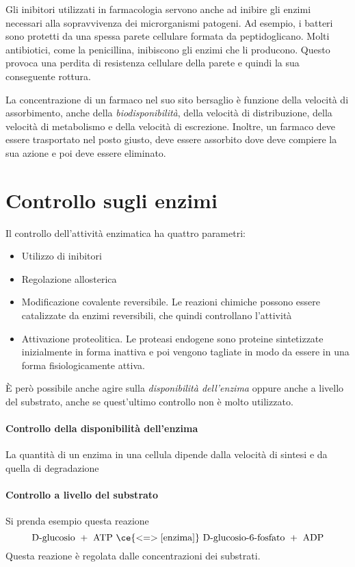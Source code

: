 Gli inibitori utilizzati in farmacologia servono anche ad inibire gli enzimi necessari alla sopravvivenza dei microrganismi patogeni. Ad esempio, i batteri sono protetti da una spessa parete cellulare formata da peptidoglicano. Molti antibiotici, come la penicillina, inibiscono gli enzimi che li producono. Questo provoca una perdita di resistenza cellulare della parete e quindi la sua conseguente rottura.

La concentrazione di un farmaco nel suo sito bersaglio è funzione della velocità di assorbimento, anche della \emph{biodisponibilità}, della velocità di distribuzione, della velocità di metabolismo e della velocità di escrezione. Inoltre, un farmaco deve essere trasportato nel posto giusto, deve essere assorbito dove deve compiere la sua azione e poi deve essere eliminato.

\section{Controllo sugli enzimi}

Il controllo dell'attività enzimatica ha quattro parametri:
\begin{itemize}
\item Utilizzo di inibitori
\item Regolazione allosterica
\item Modificazione covalente reversibile. Le reazioni chimiche possono essere catalizzate da enzimi reversibili, che quindi controllano l'attività
\item Attivazione proteolitica. Le proteasi endogene sono proteine sintetizzate inizialmente in forma inattiva e poi vengono tagliate in modo da essere in una forma fisiologicamente attiva.
\end{itemize}

È però possibile anche agire sulla \emph{disponibilità dell'enzima} oppure anche a livello del substrato, anche se quest'ultimo controllo non è molto utilizzato.

\paragraph{Controllo della disponibilità dell'enzima}

La quantità di un enzima in una cellula dipende dalla velocità di sintesi e da quella di degradazione

\paragraph{Controllo a livello del substrato}
Si prenda esempio questa reazione
\[
\text{D-glucosio } + \text{ ATP } \ce{<=>[\text{enzima}]} \text{ D-glucosio-6-fosfato } + \text{ ADP}
\]
Questa reazione è regolata dalle concentrazioni dei substrati.

